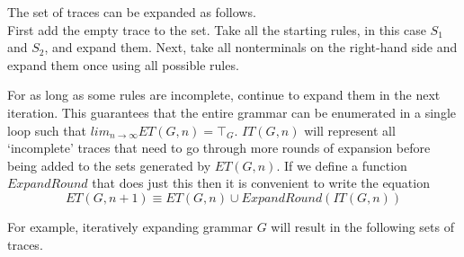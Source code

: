 \documentclass[a4paper,11pt]{article}
\begin{document}
The set of traces can be expanded as follows.\\
First add the empty trace to the set. 
Take all the starting rules, in this case $S_1$ and $S_2$, and expand them.
Next, take all nonterminals on the right-hand side and expand them once using all possible rules. 

For as long as some rules are incomplete, continue to expand them in the next iteration. This guarantees that the entire grammar can be enumerated in a single loop such that $lim_{n \to \infty} ET(G,n) = \top_{G}$.
$IT(G, n)$ will represent all `incomplete' traces that need to go through more rounds of expansion before being added to the sets generated by $ET(G, n)$.
If we define a function $ExpandRound$ that does just this then it is convenient to write the equation 
\begin{equation} ET(G, n+1) \equiv ET(G, n) \cup ExpandRound(IT(G, n)) \end{equation}

For example, iteratively expanding grammar $G$ will result in the following sets of traces.
\end{document}
